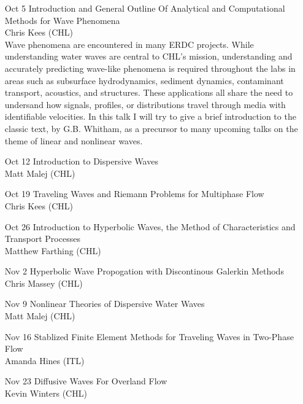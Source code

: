 \documentclass[12]{article}
\begin{document}
\begin{enumerate}

\item[Oct 5] Introduction and General Outline Of Analytical and
  Computational Methods for Wave Phenomena\\ Chris Kees (CHL)\\ Wave
  phenomena are encountered in many ERDC projects. While understanding
  water waves are central to CHL's mission, understanding and
  accurately predicting wave-like phenomena is required throughout the
  labs in areas such as subsurface hydrodynamics, sediment dynamics,
  contaminant transport, acoustics, and structures.  These
  applications all share the need to undersand how signals, profiles,
  or distributions travel through media with identifiable
  velocities. In this talk I will try to give a brief introduction to
  the classic text, 
  by G.B. Whitham, as a precursor to many upcoming talks on the theme
  of linear and nonlinear waves.

\item[Oct 12] Introduction to Dispersive Waves\\
Matt Malej (CHL)\\

\item[Oct 19] Traveling Waves and Riemann Problems for Multiphase Flow\\
Chris Kees (CHL)\\

\item[Oct 26] Introduction to Hyperbolic Waves, the Method of Characteristics and Transport Processes\\
Matthew Farthing (CHL)\\

\item[Nov 2] Hyperbolic Wave Propogation with Discontinous Galerkin Methods\\
Chris Massey (CHL)\\

\item[Nov 9] Nonlinear Theories of Dispersive Water Waves\\
Matt Malej (CHL)\\

\item[Nov 16] Stablized Finite Element Methods for Traveling Waves in Two-Phase Flow\\
Amanda Hines (ITL)\\

\item[Nov 23] Diffusive Waves For Overland Flow\\
Kevin Winters (CHL)\\

\end{enumerate}
\end{document}
